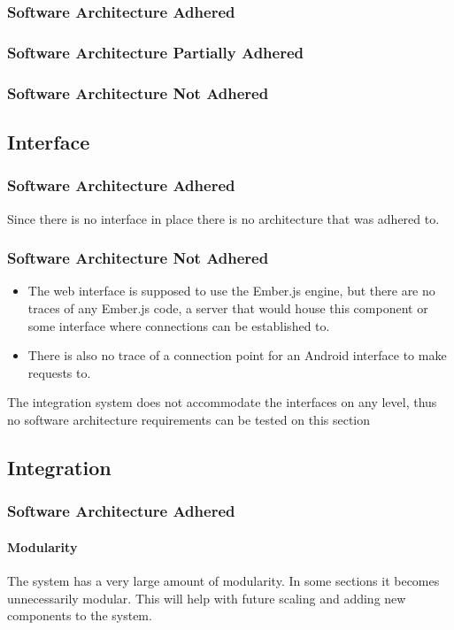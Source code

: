 \documentclass{article}
\begin{document}
        \subsubsection{Software Architecture Adhered}
        \subsubsection{Software Architecture Partially Adhered}
        \subsubsection{Software Architecture Not Adhered}       
		
	\subsection{Interface}
		\subsubsection{Software Architecture Adhered}
			Since there is no interface in place there is no architecture that was adhered to.
		\subsubsection{Software Architecture Not Adhered}
			\begin{itemize}	
				\item The web interface is supposed to use the Ember.js engine, but there are no traces of any Ember.js code, a server that would house this component or some interface where connections can be established to.
				\item There is also no trace of a connection point for an Android interface to make requests to.
			\end{itemize}
			The integration system does not accommodate the interfaces on any level, thus no software architecture requirements can be tested on this section

	\subsection{Integration}
		\subsubsection{Software Architecture Adhered}
			\paragraph{Modularity} The system has a very large amount of modularity. In some sections it becomes unnecessarily modular. This will help with future scaling and adding new components to the system.
			
\end{document}
